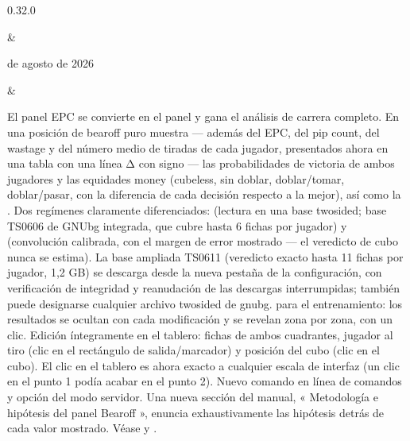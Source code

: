 \documentclass[letterpaper,10pt,spanish]{sphinxmanual}
\begin{document}
\begin{savenotes}
\begin{longtable}{}
\begin{varwidth}[t]{}
0.32.0
\sphinxbeforeendvarwidth
\end{varwidth}%
&\begin{varwidth}[t]{}
 de agosto de 2026
\sphinxbeforeendvarwidth
\end{varwidth}%
&\begin{varwidth}[t]{}
\sphinxAtStartPar
El panel EPC se convierte en el panel  y gana el análisis de carrera completo. En una posición de bearoff puro muestra — además del EPC, del pip count, del wastage y del número medio de tiradas de cada jugador, presentados ahora en una tabla con una línea Δ con signo — las probabilidades de victoria de ambos jugadores y las equidades money (cubeless, sin doblar, doblar/tomar, doblar/pasar, con la diferencia de cada decisión respecto a la mejor), así como la . Dos regímenes claramente diferenciados:  (lectura en una base two\sphinxhyphen{}sided; base TS\sphinxhyphen{}06\sphinxhyphen{}06 de GNUbg integrada, que cubre hasta 6 fichas por jugador) y  (convolución calibrada, con el margen de error mostrado — el veredicto de cubo nunca se estima). La base ampliada TS\sphinxhyphen{}06\sphinxhyphen{}11 (veredicto exacto hasta 11 fichas por jugador, 1,2 GB) se descarga desde la nueva pestaña  de la configuración, con verificación de integridad y reanudación de las descargas interrumpidas; también puede designarse cualquier archivo  two\sphinxhyphen{}sided de gnubg.  para el entrenamiento: los resultados se ocultan con cada modificación y se revelan zona por zona, con un clic. Edición íntegramente en el tablero: fichas de ambos cuadrantes, jugador al tiro (clic en el rectángulo de salida/marcador) y posición del cubo (clic en el cubo). El clic en el tablero es ahora exacto a cualquier escala de interfaz (un clic en el punto 1 podía acabar en el punto 2). Nuevo comando  en línea de comandos y opción  del modo servidor. Una nueva sección del manual, « Metodología e hipótesis del panel Bearoff », enuncia exhaustivamente las hipótesis detrás de cada valor mostrado. Véase {\hyperref[\detokenize{manuel:panneau-epc}]{}} y {\hyperref[\detokenize{manuel:epc-methodologie}]{}}.
\sphinxbeforeendvarwidth
\end{varwidth}%
\\
\sphinxbottomrule
\end{longtable}
\sphinxtableafterendhook
\sphinxatlongtableend
\end{savenotes}
\end{document}
